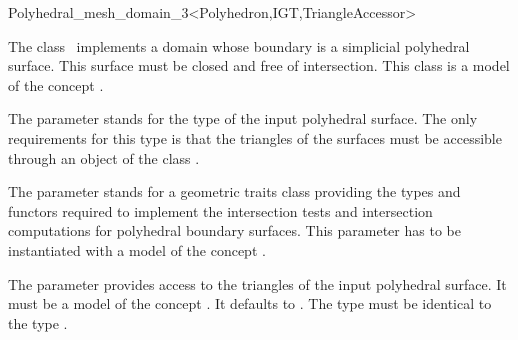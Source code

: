 \ccRefPageBegin


\begin{ccRefClass}{Polyhedral_mesh_domain_3<Polyhedron,IGT,TriangleAccessor>}  %


\ccDefinition
  
The class \ccRefName\ implements 
a domain whose boundary is a simplicial polyhedral surface.
 This surface must be closed and  free of intersection.
This class is a model of the concept .

\ccParameters

The parameter  stands for the type of the input polyhedral surface. 
The only requirements for this type is that the triangles of the surfaces
must be accessible through an object of the class  
.

The parameter  stands for  a geometric  traits class
providing the types and functors required to implement
the intersection tests and intersection computations
for polyhedral boundary  surfaces. This parameter has to be instantiated
with a model of the concept .

The parameter   provides access to the triangles
of the input polyhedral 
surface. It must be a model of the concept
. It defaults to
. The type  must
be identical to the type .
 


\ccIsModel
{}


\ccCreation
{}  %


\end{ccRefClass}
